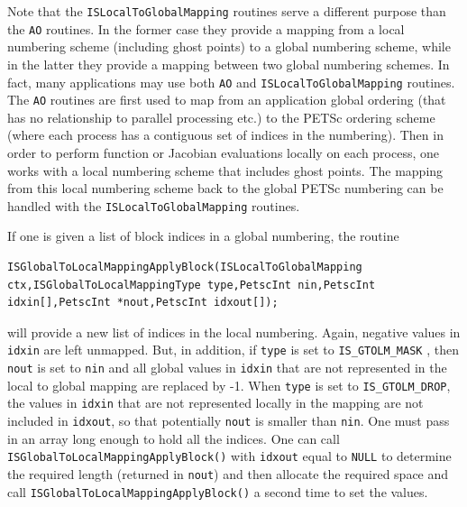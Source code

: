 Note that the \lstinline{ISLocalToGlobalMapping} routines serve a different purpose
than the \lstinline{AO} routines. In the former case they provide a mapping
from  a local numbering scheme (including ghost points) to a global numbering scheme,
while in the latter they provide a mapping between two global numbering schemes.
In fact, many applications may use both \lstinline{AO} and \lstinline{ISLocalToGlobalMapping} routines.
The \lstinline{AO} routines are first used to map from an application global ordering
(that has no relationship to parallel processing etc.) to the PETSc ordering scheme
(where each process has a contiguous set of indices in the numbering). Then in order
to perform function or Jacobian evaluations locally on each process, one works
with a local numbering scheme that includes ghost points.  The mapping from this local
numbering scheme back to the global PETSc numbering can be handled with the
\lstinline{ISLocalToGlobalMapping} routines.

If one is given a list of block indices in a global numbering, the routine
\begin{lstlisting}
ISGlobalToLocalMappingApplyBlock(ISLocalToGlobalMapping ctx,ISGlobalToLocalMappingType type,PetscInt nin,PetscInt idxin[],PetscInt *nout,PetscInt idxout[]);
\end{lstlisting}
 will provide
a new list of indices in the local numbering. Again, negative values in
\lstinline{idxin} are left unmapped.  But, in addition, if \lstinline{type} is set to
\lstinline{IS_GTOLM_MASK}
,
then \lstinline{nout} is set to \lstinline{nin} and all global values
in \lstinline{idxin} that are not represented in the local to global mapping
are replaced by -1. When \lstinline{type} is set to \lstinline{IS_GTOLM_DROP},
 the values in \lstinline{idxin} that are not
represented locally in the mapping are not included in \lstinline{idxout}, so that
potentially \lstinline{nout} is smaller than \lstinline{nin}.  One must
pass in an array long enough to hold all the indices. One can call
\lstinline{ISGlobalToLocalMappingApplyBlock()} with \lstinline{idxout} equal to
\lstinline{NULL} to determine the required length (returned in
\lstinline{nout}) and then allocate the required space and call
\lstinline{ISGlobalToLocalMappingApplyBlock()} a second time to set the values.

